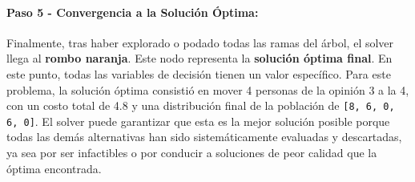 \documentclass[11pt,letter]{article}
\begin{document}
\paragraph{Paso 5 - Convergencia a la Solución Óptima:}
Finalmente, tras haber explorado o podado todas las ramas del árbol, el solver llega al \textbf{rombo naranja}. Este nodo representa la \textbf{solución óptima final}. En este punto, todas las variables de decisión tienen un valor específico. Para este problema, la solución óptima consistió en mover 4 personas de la opinión 3 a la 4, con un costo total de 4.8 y una distribución final de la población de \texttt{[8, 6, 0, 6, 0]}. El solver puede garantizar que esta es la mejor solución posible porque todas las demás alternativas han sido sistemáticamente evaluadas y descartadas, ya sea por ser infactibles o por conducir a soluciones de peor calidad que la óptima encontrada.

\section{}
\end{document}
